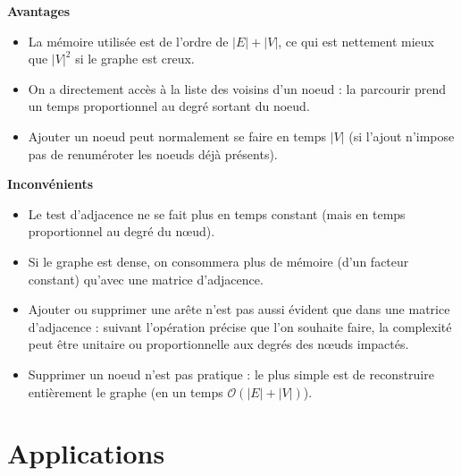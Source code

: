 \begin{minipage}[t]{.47\linewidth}
\begin{center}
\textbf{Avantages}
\end{center}
\begin{itemize}
\item La mémoire utilisée est de l’ordre de $|E| + |V|$, ce qui est nettement mieux que $|V|^2$ si le graphe est
creux.
\item On a directement accès à la liste des voisins d’un noeud : la parcourir prend un temps proportionnel
au degré sortant du noeud.%
\item Ajouter un noeud peut normalement se faire en temps $|V|$ (si l’ajout n’impose pas de renuméroter
les noeuds déjà présents).
\end{itemize}
\end{minipage}
\hfill
\begin{minipage}[t]{.47\linewidth}
\begin{center}
\textbf{Inconvénients}
\begin{itemize}
\item Le test d’adjacence ne se fait plus en temps constant (mais en temps proportionnel au degré du
nœud).
\item Si le graphe est dense, on consommera plus de mémoire (d’un facteur constant) qu’avec une matrice
d’adjacence.
\item Ajouter ou supprimer une arête n’est pas aussi évident que dans une matrice d’adjacence : suivant
l’opération précise que l’on souhaite faire, la complexité peut être unitaire ou proportionnelle aux
degrés des nœuds impactés.
\item  Supprimer un noeud n’est pas pratique : le plus simple est de reconstruire entièrement le graphe (en
un temps $\mathcal{O}\left(|E| + |V|\right)$).
\end{itemize}
\end{center}
\end{minipage}

\section{Applications}

